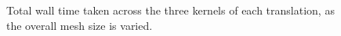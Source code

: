 \begin{figure}[H]
    \centering
    
    \caption{Total wall time taken across the three kernels of each translation, as the overall mesh size is varied.}
    \label{fig:translations_total_line}
\end{figure}

%     






